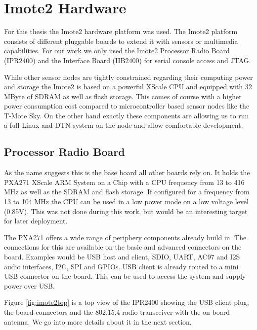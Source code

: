 \chapter{Imote2 Hardware}
For this thesis the Imote2 hardware platform was used. The Imote2 platform
consists of different pluggable boards to extend it with sensors or multimedia
capabilities. For our work we only used the Imote2 Processor Radio Board
(IPR2400) and the Interface Board (IIB2400) for serial console access and JTAG.

While other sensor nodes are tightly constrained regarding their computing power
and storage the Imote2 is based on a powerful XScale CPU and equipped with 32
MByte of SDRAM as well as flash storage. This comes of course with a higher power
consumption cost compared to microcontroller based sensor nodes like the T-Mote
Sky. On the other hand exactly these components are allowing us to run a full
Linux and DTN system on the node and allow comfortable development.

\section{Processor Radio Board}
As the name suggests this is the base board all other boards rely on. It holds
the PXA271 XScale ARM System on a Chip with a CPU frequency from 13 to 416 MHz
as well as the SDRAM and flash storage. If configured for a frequency from 13
to 104 MHz the CPU can be used in a low power mode on a low voltage level
(0.85V). This was not done during this work, but would be an interesting target
for later deployment.

The PXA271 offers a wide range of periphery components already build in. The
connections for this are available on the basic and advanced connectors on the
board. Examples would be USB host and client, SDIO, UART, AC97 and I2S audio
interfaces, I2C, SPI and GPIOs. USB client is already routed to a mini USB
connector on the board. This can be used to access the system and supply power
over USB.

Figure \ref{fig:imote2top} is a top view of the IPR2400 showing the USB client plug,
the board connectors and the 802.15.4 radio transceiver with the on board
antenna. We go into more details about it in the next section.

